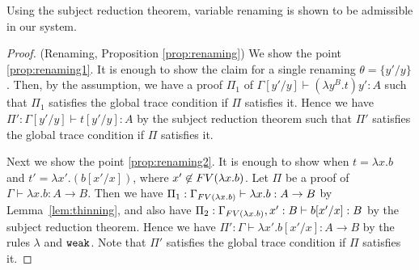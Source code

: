 Using the subject reduction theorem, variable renaming is shown to be admissible in our system. 



\begin{proof}(Renaming, Proposition \ref{prop:renaming})
  We show the point \ref{prop:renaming1}. 
  It is enough to show the claim for a single renaming $\theta = \{y'/y\}$.
  Then, by the assumption, we have a proof $\Pi_1$ of $\Gamma[y'/y] \vdash (\lambda y^B.t)y':A$
  such that $\Pi_1$ satisfies the global trace condition if $\Pi$ satisfies it.  
  Hence we have $\Pi': \Gamma[y'/y] \vdash t[y'/y]:A$ by the subject reduction theorem
  such that $\Pi'$ satisfies the global trace condition if $\Pi$ satisfies it.

  Next we show the point \ref{prop:renaming2}.
  It is enough to show when $t = \lambda x.b$ and $t' = \lambda x'.(b[x'/x])$, where $x'\not\in{{\relax FV}}(\lambda x.b)$. 
  Let $\Pi$ be a proof of $\Gamma\vdash \lambda x.b:A\to B$.
  Then we have $\Pi_1: \Gamma_{{{\relax FV}}(\lambda x.b)} \vdash \lambda x.b:A\to B$
  by Lemma~\ref{lem:thinning}, and
  also have $\Pi_2: \Gamma_{{{\relax FV}}(\lambda x.b)},x':B \vdash b[x'/x]:B$
  by the subject reduction theorem. 
  Hence we have $\Pi': \Gamma \vdash \lambda x'.b[x'/x]:A\to B$ by the rules $\lambda$ and ${\tt weak}$. 
  Note that $\Pi'$ satisfies the global trace condition if $\Pi$ satisfies it. 
\end{proof}





%
%

